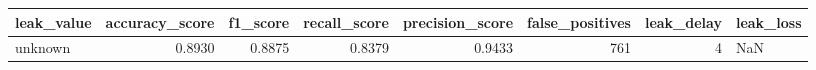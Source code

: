 \begin{tabular}{lrrrrrrl}
\toprule
leak\_value & accuracy\_score & f1\_score & recall\_score & precision\_score & false\_positives & leak\_delay & leak\_loss \\
\midrule
unknown & 0.8930 & 0.8875 & 0.8379 & 0.9433 & 761 & 4 & NaN \\
\bottomrule
\end{tabular}
